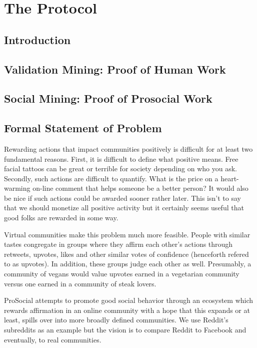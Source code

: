 \section{\textbf{The Protocol}}

\subsection{Introduction}

\subsection{Validation Mining: Proof of Human Work}


\subsection{Social Mining: Proof of Prosocial Work}

\subsection{Formal Statement of Problem}


Rewarding actions that impact communities positively is difficult for at least two fundamental reasons. First, it is difficult to define what positive means. Free facial tattoos can be great or terrible for society depending on who you ask. Secondly, such actions are difficult to quantify. What is the price on a heart-warming on-line comment that helps someone be a better person? It would also be nice if such actions could be awarded sooner rather later. This isn't to say that we should monetize all positive activity but it certainly seems useful that good folks are rewarded in some way.

Virtual communities make this problem much more feasible. People with similar tastes congregate in groups where they affirm each other's actions through retweets, upvotes, likes and other similar votes of confidence (henceforth refered to as upvotes). In addition, these groups judge each other as well. Presumably, a community of vegans would value upvotes earned in a vegetarian community versus one earned in a community of steak lovers. 

ProSocial attempts to promote good social behavior through an ecosystem which rewards affirmation in an online community with a hope that this expands or at least, spills over into more broadly defined communities. We use Reddit's subreddits as an example but the vision is to compare Reddit to Facebook and eventually, to real communities.

